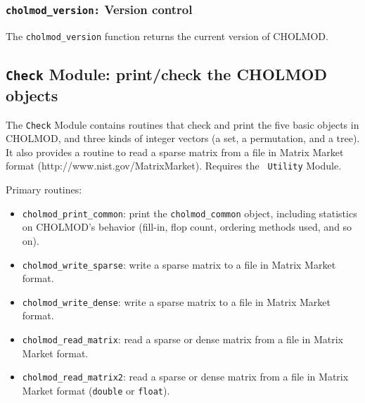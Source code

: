 \documentclass[11pt]{article}
\begin{document}
\subsubsection{{\tt cholmod\_version:} Version control}

The {\tt cholmod\_version} function returns the current version of CHOLMOD.

\subsection{{\tt Check} Module: print/check the CHOLMOD objects}

The {\tt Check} Module contains routines that check and print the five basic
objects in CHOLMOD, and three kinds of integer vectors (a set, a permutation,
and a tree).  It also provides a routine to read a sparse matrix from a file in
Matrix Market format (http://www.nist.gov/MatrixMarket).  Requires the {\tt
Utility} Module.

\vspace{0.1in}
\noindent Primary routines:
    \begin{itemize}
    \item {\tt cholmod\_print\_common}: print the {\tt cholmod\_common} object,
        including statistics on CHOLMOD's behavior (fill-in, flop count,
        ordering methods used, and so on).
    \item {\tt cholmod\_write\_sparse}: write a sparse matrix to a file
        in Matrix Market format.
    \item {\tt cholmod\_write\_dense}: write a sparse matrix to a file
        in Matrix Market format.
    \item {\tt cholmod\_read\_matrix}: read a sparse or dense matrix from a file
        in Matrix Market format.
    \item {\tt cholmod\_read\_matrix2}: read a sparse or dense matrix from a
        file in Matrix Market format
        ({\tt double} or {\tt float}).
    \end{itemize}
\end{document}
